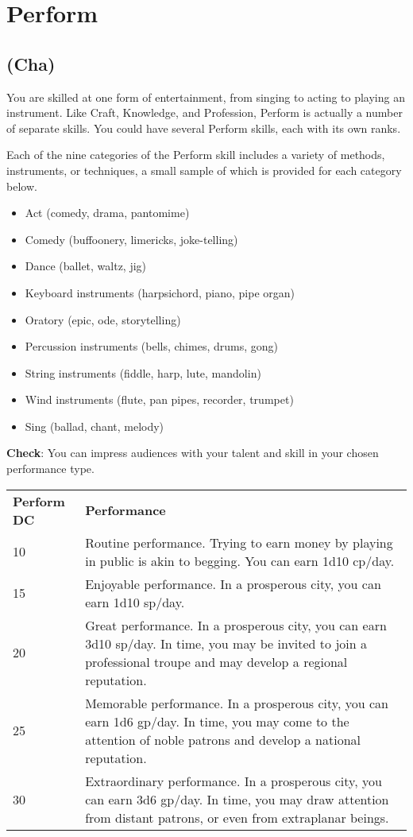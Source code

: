 \section{Perform}

\label{f0}
\subsection{(Cha)}

				
You are skilled at one form of entertainment, from singing to acting to playing an instrument. Like Craft, Knowledge, and Profession, Perform is actually a number of separate skills. You could have several Perform skills, each with its own ranks.
				
Each of the nine categories of the Perform skill includes a variety of methods, instruments, or techniques, a small sample of which is provided for each category below.
				\begin{itemize}\item  Act (comedy, drama, pantomime)
				\item  Comedy (buffoonery, limericks, joke-telling)
				\item  Dance (ballet, waltz, jig)
				\item  Keyboard instruments (harpsichord, piano, pipe organ)
				\item  Oratory (epic, ode, storytelling)
				\item  Percussion instruments (bells, chimes, drums, gong)
				\item  String instruments (fiddle, harp, lute, mandolin)
				\item  Wind instruments (flute, pan pipes, recorder, trumpet)
				\item  Sing (ballad, chant, melody)
\end{itemize}
				
\textbf{Check}: You can impress audiences with your talent and skill in your chosen performance type.
\begin{table}
 \begin{tabular}{ll}
  \textbf{Perform DC} & \textbf{Performance}\\
  10 & Routine performance. Trying to earn money by playing in public is akin to begging. You can earn 1d10 cp/day.\\
15 & Enjoyable performance. In a prosperous city, you can earn 1d10 sp/day.\\
20 & Great performance. In a prosperous city, you can earn 3d10 sp/day. In time, you may be invited to join a professional troupe and may develop a regional reputation.\\
25 & Memorable performance. In a prosperous city, you can earn 1d6 gp/day. In time, you may come to the attention of noble patrons and develop a national reputation.\\
30 & Extraordinary performance. In a prosperous city, you can earn 3d6 gp/day. In time, you may draw attention from distant patrons, or even from extraplanar beings.\\		
 \end{tabular}
\end{table}
	
